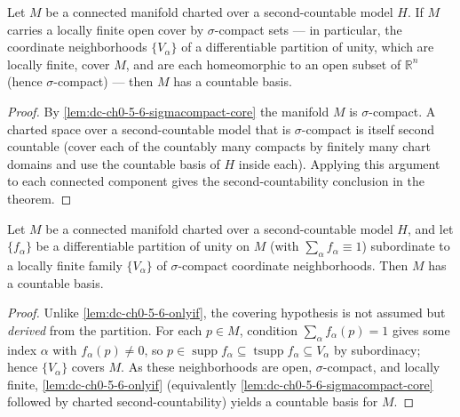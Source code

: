 \begin{lemma}
  \label{lem:dc-ch0-5-6-onlyif}
  \leanok
  Let $M$ be a connected manifold charted over a second-countable model $H$. If $M$
  carries a locally finite open cover by $\sigma$-compact sets — in particular, the
  coordinate neighborhoods $\{V_\alpha\}$ of a differentiable partition of unity,
  which are locally finite, cover $M$, and are each homeomorphic to an open subset
  of $\mathbb{R}^n$ (hence $\sigma$-compact) — then $M$ has a countable basis.
\end{lemma}
\begin{proof}
  \sketch
  \leanok
  By \cref{lem:dc-ch0-5-6-sigmacompact-core} the manifold $M$ is $\sigma$-compact.
  A charted space over a second-countable model that is $\sigma$-compact is itself
  second countable (cover each of the countably many compacts by finitely many chart
  domains and use the countable basis of $H$ inside each). Applying this argument to
  each connected component gives the second-countability
  conclusion in the theorem.
\end{proof}

\begin{lemma}
  \label{lem:dc-ch0-5-6-onlyif-pou}
  \leanok
  Let $M$ be a connected manifold charted over a second-countable model $H$, and let
  $\{f_\alpha\}$ be a differentiable partition of unity on $M$ (with $\sum_\alpha f_\alpha
  \equiv 1$) subordinate to a locally finite family $\{V_\alpha\}$ of $\sigma$-compact
  coordinate neighborhoods. Then $M$ has a countable basis.
\end{lemma}
\begin{proof}
  \sketch
  \leanok
  Unlike \cref{lem:dc-ch0-5-6-onlyif}, the covering hypothesis is not assumed but
  \emph{derived} from the partition. For each $p\in M$, condition $\sum_\alpha f_\alpha(p)=1$
  gives some index $\alpha$ with $f_\alpha(p)\neq0$, so $p\in\operatorname{supp}f_\alpha
  \subseteq\operatorname{tsupp}f_\alpha\subseteq V_\alpha$ by subordinacy; hence
  $\{V_\alpha\}$ covers $M$. As these neighborhoods are open, $\sigma$-compact, and locally
  finite, \cref{lem:dc-ch0-5-6-onlyif} (equivalently
  \cref{lem:dc-ch0-5-6-sigmacompact-core} followed by charted second-countability) yields a
  countable basis for $M$.
\end{proof}

